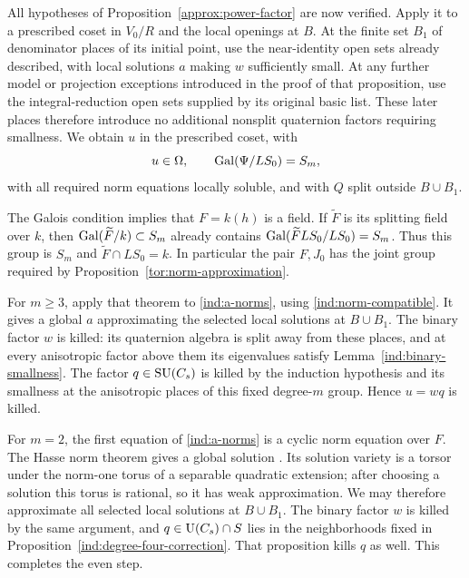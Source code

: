All hypotheses of Proposition~\ref{approx:power-factor} are now verified.
Apply it to a prescribed coset in $V_0/R$ and the local openings at $B$.
At the finite set $B_1$ of denominator places of its initial point, use
the near-identity open sets already described, with local solutions
$a$ making $w$ sufficiently small.  At any further model or projection
exceptions introduced in the proof of that proposition, use the
integral-reduction open sets supplied by its original basic list.
These later places therefore introduce no additional nonsplit
quaternion factors requiring smallness.  We obtain $u$ in the
prescribed coset, with
\[
 u\in\Omega,\qquad \operatorname{Gal}(\Psi/LS_0)=S_m,
\]
with all required norm equations locally soluble, and with $Q$ split
outside $B\cup B_1$.

The Galois condition implies that $F=k(h)$ is a field.  If $\widetilde F$
is its splitting field over $k$, then
$\operatorname{Gal}(\widetilde F/k)\subset S_m$ already contains
$\operatorname{Gal}(\widetilde F LS_0/LS_0)=S_m$.  Thus this group is $S_m$ and
$\widetilde F\cap LS_0=k$.  In particular the pair $F,J_0$ has the
joint group required by Proposition~\ref{tor:norm-approximation}.

For $m\geq3$, apply that theorem to \eqref{ind:a-norms}, using
\eqref{ind:norm-compatible}.  It gives a global $a$ approximating the
selected local solutions at $B\cup B_1$.  The binary factor $w$ is
killed: its quaternion algebra is split away from these places, and
at every anisotropic factor above them its eigenvalues satisfy
Lemma~\ref{ind:binary-smallness}.  The factor $q\in\operatorname{SU}(C_s)$ is killed
by the induction hypothesis and its smallness at the anisotropic
places of this fixed degree-$m$ group.  Hence $u=wq$ is killed.

For $m=2$, the first equation of \eqref{ind:a-norms} is a cyclic norm
equation over $F$.  The Hasse norm theorem gives a global solution \cite{MilneCFT}.
Its solution variety is a torsor under the norm-one torus of a
separable quadratic extension; after choosing a solution this torus
is rational, so it has weak approximation.  We may therefore approximate
all selected local solutions at $B\cup B_1$.  The binary factor $w$
is killed by the same argument, and $q\in\operatorname{U}(C_s)\cap S$ lies in the
neighborhoods fixed in Proposition~\ref{ind:degree-four-correction}.
That proposition kills $q$ as well.  This completes the even step.

